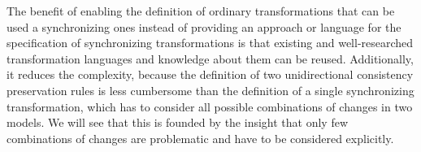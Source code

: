 
The benefit of enabling the definition of ordinary transformations that can be used a synchronizing ones instead of providing an approach or language for the specification of synchronizing transformations is that existing and well-researched transformation languages and knowledge about them can be reused.
Additionally, it reduces the complexity, because the definition of two unidirectional consistency preservation rules is less cumbersome than the definition of a single synchronizing transformation, which has to consider all possible combinations of changes in two models.
We will see that this is founded by the insight that only few combinations of changes are problematic and have to be considered explicitly.






